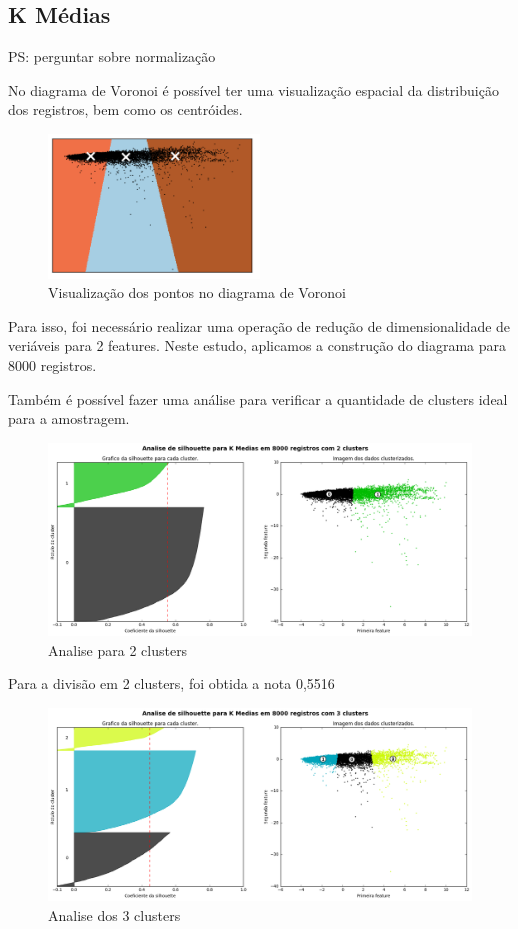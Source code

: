 \subsection{K Médias}

PS: perguntar sobre normalização

No diagrama de Voronoi é possível ter uma visualização espacial da distribuição dos registros, bem como os centróides.

\begin{figure}[!ht]
\caption{Visualização dos pontos no diagrama de Voronoi }
\centerline{\includegraphics[width=0.5\textwidth]{img/voronoi}}
\end{figure}

 Para isso, foi necessário realizar uma operação de redução de dimensionalidade de veriáveis para 2 features. Neste estudo, aplicamos a construção do diagrama para 8000 registros.


Também é possível fazer uma análise para verificar a quantidade de clusters ideal para a amostragem.

\begin{figure}[!ht]
\caption{Analise para 2 clusters }
\centerline{\includegraphics[width=.8\textwidth]{img/silhoute2}}
\end{figure}

Para a divisão em 2 clusters, foi obtida a nota 0,5516

\begin{figure}[!ht]
\caption{Analise dos 3 clusters }
\centerline{\includegraphics[width=.8\textwidth]{img/silhoute3}}
\end{figure}


